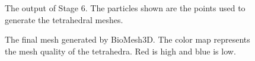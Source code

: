 \documentclass[fleqn,12pt,openany]{book}
\begin{document}
\begin{figure}
\begin{center}
\end{center}
\caption{\label{fig:tooth_stage4} The output of Stage 6. The particles shown are the points used to generate the tetrahedral meshes.}
\end{figure} 

\begin{figure}
\begin{center}
\end{center}
\caption{\label{fig:tooth_stage5} The final mesh generated by BioMesh3D. The color map represents the mesh quality of the tetrahedra. Red is high and blue is low.}
\end{figure} 
\end{document}
